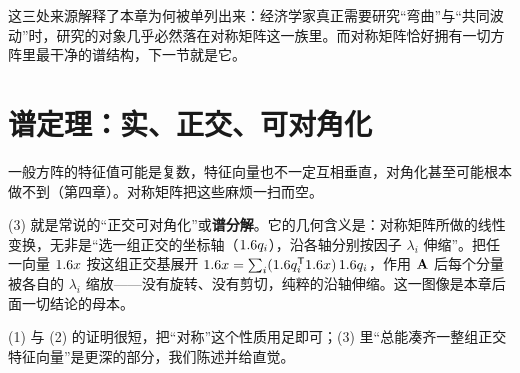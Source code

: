 这三处来源解释了本章为何被单列出来：经济学家真正需要研究``弯曲''与``共同波动''时，研究的对象几乎必然落在对称矩阵这一族里。而对称矩阵恰好拥有一切方阵里最干净的谱结构，下一节就是它。

\section{谱定理：实、正交、可对角化}
\label{sec:spectral-2}

一般方阵的特征值可能是复数，特征向量也不一定互相垂直，对角化甚至可能根本做不到（第四章）。对称矩阵把这些麻烦一扫而空。


(3) 就是常说的``正交可对角化''或\textbf{谱分解}。它的几何含义是：对称矩阵所做的线性变换，无非是``选一组正交的坐标轴（$1.6 q_i$），沿各轴分别按因子 $\lambda_i$ 伸缩''。把任一向量 $1.6 x$ 按这组正交基展开 $1.6 x=\sum_i (1.6 q_i^{\mathsf{T}}1.6 x)\,1.6 q_i$，作用 $\mathbf{A}$ 后每个分量被各自的 $\lambda_i$ 缩放——没有旋转、没有剪切，纯粹的沿轴伸缩。这一图像是本章后面一切结论的母本。

(1) 与 (2) 的证明很短，把``对称''这个性质用足即可；(3) 里``总能凑齐一整组正交特征向量''是更深的部分，我们陈述并给直觉。


